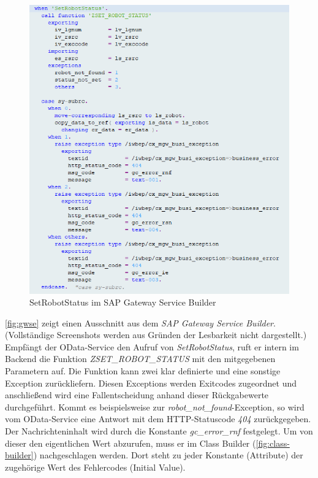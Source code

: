 \begin{figure}[!ht]
	\centering
	\includegraphics[width=\textwidth]{Bilder/ABAP/2020-12-04 10_20_43-Class Builder Class ZCL_ZEWM_ROBCO_DPC_EXT Display_cut.png}
	\caption{SetRobotStatus im SAP Gateway Service Builder}
	\label{fig:gwse}
\end{figure}

\autoref{fig:gwse} zeigt einen Ausschnitt aus dem \emph{SAP Gateway Service Builder}.
(Vollständige Screenshots werden aus Gründen der Lesbarkeit nicht dargestellt.)
Empfängt der \ac{OData}-Service den Aufruf von \emph{SetRobotStatus}, ruft er intern im Backend die Funktion \emph{ZSET\_ROBOT\_STATUS} mit den mitgegebenen Parametern auf.
Die Funktion kann zwei klar definierte und eine sonstige Exception zurückliefern.
Diesen Exceptions werden Exitcodes zugeordnet und anschließend wird eine Fallentscheidung anhand dieser Rückgabewerte durchgeführt.
Kommt es beispielsweise zur \emph{robot\_not\_found}-Exception, so wird vom \ac{OData}-Service eine Antwort mit dem \ac{HTTP}-Statuscode \emph{404} zurückgegeben.
Der Nachrichteninhalt wird durch die Konstante \emph{gc\_error\_rnf} festgelegt.
Um von dieser den eigentlichen Wert abzurufen, muss er im Class Builder (\autoref{fig:class-builder}) nachgeschlagen werden.
Dort steht zu jeder Konstante (Attribute) der zugehörige Wert des Fehlercodes (Initial Value).

